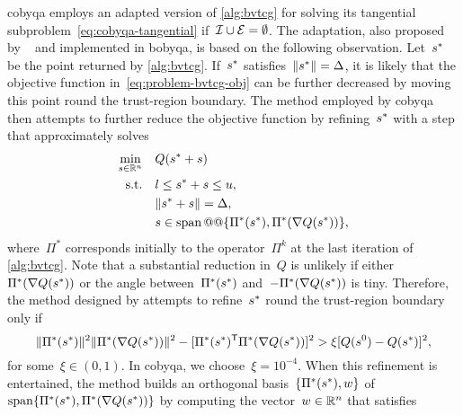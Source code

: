 \Gls{cobyqa} employs an adapted version of \cref{alg:bvtcg} for solving its tangential subproblem~\cref{eq:cobyqa-tangential} if~$\mathcal{I} \cup \mathcal{E} = \emptyset$.
The adaptation, also proposed by \citeauthor{Powell_2009}~\cite[\S~3]{Powell_2009} and implemented in \gls{bobyqa}, is based on the following observation.
Let~$\sstep[\ast]$ be the point returned by \cref{alg:bvtcg}.
If~$\sstep[\ast]$ satisfies~$\norm{\sstep[\ast]} = \rad$, it is likely that the objective function in~\cref{eq:problem-bvtcg-obj} can be further decreased by moving this point round the trust-region boundary.
The method employed by \gls{cobyqa} then attempts to further reduce the objective function by refining~$\sstep[\ast]$ with a step that approximately solves
\begin{subequations}
    \label{eq:cobyqa-tangential-bounds-alternative}
    \begin{align}
        \min_{\sstep \in \R^n}  & \quad Q(\sstep[\ast] + \sstep)\\
        \text{s.t.}             & \quad \xl \le \sstep[\ast] + \sstep \le \xu,\\
                                & \quad \norm{\sstep[\ast] + \sstep} = \rad,\\
                                & \quad \sstep \in \vspan @@ \set{\Pi^{\ast}(\sstep[\ast]), \Pi^{\ast}(\nabla Q(\sstep[\ast]))},
    \end{align}
\end{subequations}
where~$\Pi^{\ast}$ corresponds initially to the operator~$\Pi^k$ at the last iteration of \cref{alg:bvtcg}.
Note that a substantial reduction in~$Q$ is unlikely if either~$\Pi^{\ast}(\nabla Q(\sstep[\ast]))$ or the angle between~$\Pi^{\ast}(\sstep[\ast])$ and~$-\Pi^{\ast}(\nabla Q(\sstep[\ast]))$ is tiny.
Therefore, the method designed by \citeauthor{Powell_2009} attempts to refine~$\sstep[\ast]$ round the trust-region boundary only if
\begin{equation*}
    \norm{\Pi^{\ast}(\sstep[\ast])}^2 \norm{\Pi^{\ast}(\nabla Q(\sstep[\ast]))}^2 - [\Pi^{\ast}(\sstep[\ast])^{\T} \Pi^{\ast}(\nabla Q(\sstep[\ast]))]^2 > \xi [Q(\sstep[0]) - Q(\sstep[\ast])]^2,
\end{equation*}
for some~$\xi \in (0, 1)$.
In \gls{cobyqa}, we choose~$\xi = 10^{-4}$.
When this refinement is entertained, the method builds an orthogonal basis~$\set{\Pi^{\ast}(\sstep[\ast]), w}$ of~$\vspan \set{\Pi^{\ast}(\sstep[\ast]), \Pi^{\ast}(\nabla Q(\sstep[\ast]))}$ by computing the vector~$w \in \mathbb{R}^n$ that satisfies
